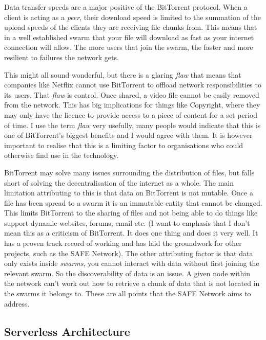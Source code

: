 \documentclass{l4proj}
\begin{document}
Data transfer speeds are a major positive of the BitTorrent protocol. When a client is acting as a \textit{peer}, their download speed is limited to the summation of the upload speeds of the clients they are receiving file chunks from. This means that in a well established swarm that your file will download as fast as your internet connection will allow. The more users that join the swarm, the faster and more resilient to failures the network gets.

This might all sound wonderful, but there is a glaring \textit{flaw} that means that companies like Netflix cannot use BitTorrent to offload network responsibilities to its users. That \textit{flaw} is control. Once shared, a video file cannot be easily removed from the network. This has big implications for things like Copyright, where they may only have the licence to provide access to a piece of content for a set period of time. I use the term \textit{flaw} very usefully, many people would indicate that this is one of BitTorrent's biggest benefits and I would agree with them. It is however important to realise that this is a limiting factor to organisations who could otherwise find use in the technology.

BitTorrent may solve many issues surrounding the distribution of files, but falls short of solving the decentralisation of the internet as a whole. The main limitation attributing to this is that data on BitTorrent is not mutable. Once a file has been spread to a swarm it is an immutable entity that cannot be changed. This limits BitTorrent to the sharing of files and not being able to do things like support dynamic websites, forums, email etc. (I want to emphasis that I don't mean this as a criticism of BitTorrent. It does one thing and does it very well. It has a proven track record of working and has laid the groundwork for other projects, such as the SAFE Network). The other attributing factor is that data only exists inside \textit{swarms}, you cannot interact with data without first joining the relevant swarm. So the discoverability of data is an issue. A given node within the network can't work out how to retrieve a chunk of data that is not located in the swarms it belongs to. These are all points that the SAFE Network aims to address.

\subsection{Serverless Architecture}
\end{document}
